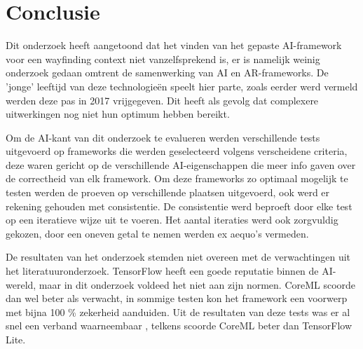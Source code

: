 
\chapter{Conclusie}
\label{ch:conclusie}


Dit onderzoek heeft aangetoond dat het vinden van het gepaste AI-framework voor een wayfinding context niet vanzelfsprekend is, er is namelijk weinig onderzoek gedaan omtrent de samenwerking van AI en AR-frameworks. De 'jonge' leeftijd van deze technologieën speelt hier parte, zoals eerder werd vermeld werden deze pas in 2017 vrijgegeven. Dit heeft als gevolg dat complexere uitwerkingen nog niet hun optimum hebben bereikt.

Om de AI-kant van dit onderzoek te evalueren werden verschillende tests uitgevoerd op frameworks die werden geselecteerd volgens verscheidene criteria, deze waren gericht op de verschillende AI-eigenschappen die meer info gaven over de correctheid van elk framework. Om deze frameworks zo optimaal mogelijk te testen werden de proeven op verschillende plaatsen uitgevoerd, ook werd er rekening gehouden met consistentie. De consistentie werd beproeft door elke  test op een iteratieve wijze uit te voeren. Het aantal iteraties werd ook zorgvuldig gekozen, door een oneven getal te nemen werden ex aequo's vermeden.

De resultaten van het onderzoek stemden niet overeen met de verwachtingen uit het literatuuronderzoek. TensorFlow heeft een goede reputatie binnen de AI-wereld, maar in dit onderzoek voldeed het niet aan zijn normen. CoreML scoorde dan wel beter als verwacht, in sommige testen kon het framework een voorwerp met bijna 100 \% zekerheid aanduiden.
Uit de resultaten van deze tests was er al snel een verband waarneembaar , telkens scoorde CoreML beter dan TensorFlow Lite. 

